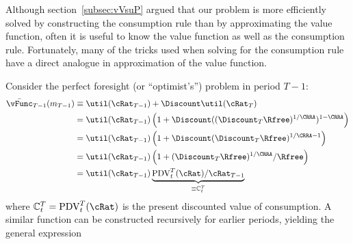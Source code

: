 
  Although section~\ref{subsec:vVsuP} argued that our problem is more
  efficiently solved by constructing the consumption rule than by
  approximating the value function, often it is useful to know the
  value function as well as the consumption rule.  Fortunately, many
  of the tricks used when solving for the consumption rule have a
  direct analogue in approximation of the value function.

  Consider the perfect foresight (or ``optimist's'') problem in period $T-1$:
  \begin{equation*}\begin{gathered}\begin{aligned}
    \bar{\vFunc}_{T-1}({m}_{T-1})  & \equiv  \util(\cRat_{T-1})+\Discount \util(\cRat_{T})
    \\  & = \util(\cRat_{T-1})\left(1+\Discount ((\Discount_{T}\Rfree)^{1/\CRRA})^{1-\CRRA}\right)
    \\  & = \util(\cRat_{T-1})\left(1+\Discount (\Discount_{T}\Rfree)^{1/\CRRA-1}\right)
    \\  & = \util(\cRat_{T-1})\left(1+(\Discount_{T}\Rfree)^{1/\CRRA}/\Rfree\right)
    \\  & = \util(\cRat_{T-1})\underbrace{\mbox{PDV}_{t}^{T}(\cRat)/\cRat_{T-1}}_{\equiv \mathbb{C}_{t}^{T}}
  \end{aligned}\end{gathered}\end{equation*}
  where $\mathbb{C}_{t}^{T}=\mbox{PDV}_{t}^{T}(\cRat)$ is the present discounted value of consumption.
  A similar function can be constructed recursively for earlier periods, yielding
  the general expression \hypertarget{vFuncPF}{}
